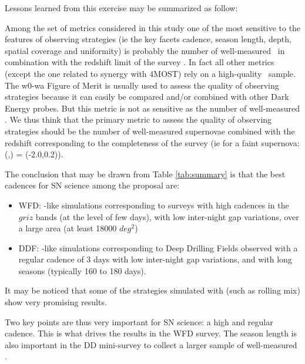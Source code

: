 \noindent Lessons learned from this exercise may be summarized as follow:


Among the set of metrics considered in this study one of the most sensitive to the features of observing strategies (ie the key facets cadence, season length, depth, spatial coverage and uniformity) is probably the number of well-measured \sne~in combination with the redshift limit of the survey \zlimit. In fact all other metrics (except the one related to synergy with 4MOST) rely on a high-quality \sne~sample. The w0-wa Figure of Merit is usually used to assess the quality of observing strategies because it can easily be compared and/or combined with other Dark Energy probes. But this metric is not as sensitive as the number of well-measured \sne. We thus think that the primary metric to assess the quality of observing strategies should be the number of well-measured supernovae combined with the redshift corresponding to the completeness of the survey (ie for a faint supernova: (\strech,\sncolor) = (-2.0,0.2)).



The conclusion that may be drawn from Table \ref{tab:summary} is that the best cadences for SN science among the proposal are:
\begin{itemize}
\item WFD: \altsched-like simulations corresponding to surveys with high cadences in the $griz$ bands (at the level of few days), with low inter-night gap variations, over a large area (at least 18000 $deg^2$) 

\item DDF: \feature-like simulations corresponding to Deep Drilling Fields observed with a regular cadence of 3 days with low inter-night gap variations, and with long seasons (typically 160 to 180 days). 
\end{itemize}

It may be noticed that some of the strategies simulated with \slair (such as rolling mix) show very promising results.

Two key points are thus very important for SN science: a high and regular cadence. This is what drives the results in the WFD survey. The season length is also important in the DD mini-survey to collect a larger sample of well-measured \sne. 


